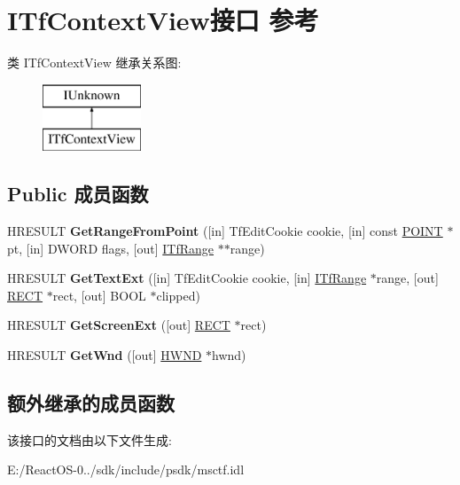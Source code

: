 \hypertarget{interface_i_tf_context_view}{}\section{I\+Tf\+Context\+View接口 参考}
\label{interface_i_tf_context_view}
类 I\+Tf\+Context\+View 继承关系图\+:\begin{figure}[H]
\begin{center}
\leavevmode
\includegraphics[height=2.000000cm]{interface_i_tf_context_view}
\end{center}
\end{figure}
\subsection*{Public 成员函数}
\begin{DoxyCompactItemize}
\item 
\mbox{\label{interface_i_tf_context_view_a0642349949653defe71a79cbd85038bf}} 
H\+R\+E\+S\+U\+LT {\bfseries Get\+Range\+From\+Point} (\mbox{[}in\mbox{]} Tf\+Edit\+Cookie cookie, \mbox{[}in\mbox{]} const \hyperlink{structtag_p_o_i_n_t}{P\+O\+I\+NT} $\ast$pt, \mbox{[}in\mbox{]} D\+W\+O\+RD flags, \mbox{[}out\mbox{]} \hyperlink{interface_i_tf_range}{I\+Tf\+Range} $\ast$$\ast$range)
\item 
\mbox{\label{interface_i_tf_context_view_ae9d198522fc9eb475b0de8a4f6f1b9e9}} 
H\+R\+E\+S\+U\+LT {\bfseries Get\+Text\+Ext} (\mbox{[}in\mbox{]} Tf\+Edit\+Cookie cookie, \mbox{[}in\mbox{]} \hyperlink{interface_i_tf_range}{I\+Tf\+Range} $\ast$range, \mbox{[}out\mbox{]} \hyperlink{structtag_r_e_c_t}{R\+E\+CT} $\ast$rect, \mbox{[}out\mbox{]} B\+O\+OL $\ast$clipped)
\item 
\mbox{\label{interface_i_tf_context_view_aa47b75632aeba2bbbbf83b79bfd5b139}} 
H\+R\+E\+S\+U\+LT {\bfseries Get\+Screen\+Ext} (\mbox{[}out\mbox{]} \hyperlink{structtag_r_e_c_t}{R\+E\+CT} $\ast$rect)
\item 
\mbox{\label{interface_i_tf_context_view_a03f36e622cee07149d1be76a51c03c09}} 
H\+R\+E\+S\+U\+LT {\bfseries Get\+Wnd} (\mbox{[}out\mbox{]} \hyperlink{interfacevoid}{H\+W\+ND} $\ast$hwnd)
\end{DoxyCompactItemize}
\subsection*{额外继承的成员函数}


该接口的文档由以下文件生成\+:\begin{DoxyCompactItemize}
\item 
E\+:/\+React\+O\+S-\/0../sdk/include/psdk/msctf.\+idl\end{DoxyCompactItemize}
